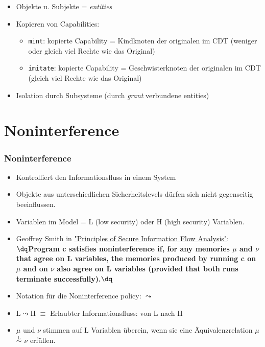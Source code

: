\documentclass{beamer}
\begin{document}
\begin{frame}
\begin{itemize}
\item Objekte u. Subjekte = \textit{entities}
\item Kopieren von Capabilities:
\begin{itemize}
\item \texttt{mint}: kopierte Capability = Kindknoten der originalen im CDT (weniger oder gleich viel Rechte wie das Original)
\item \texttt{imitate}: kopierte Capability = Geschwisterknoten der originalen im CDT (gleich viel Rechte wie das Original)
\end{itemize}
\item Isolation durch Subsysteme (durch \textit{grant} verbundene entities)
\end{itemize}
\end{frame}
\section{Noninterference}
\begin{frame}
\frametitle{Noninterference}
\begin{itemize}
\item Kontrolliert den Informationsfluss in einem System
\item Objekte aus unterschiedlichen Sicherheitslevels dürfen sich nicht gegenseitig beeinflussen.
\item Variablen im Model = L (low security) oder H (high security) Variablen.
\item Geoffrey Smith in \href{http://users.cis.fiu.edu/~smithg/papers/sif06.pdf}{%
"Principles of Secure Information Flow Analysis"}: \\
		\textbf{$\dq$Program c satisfies noninterference if, for any memories $\mu$ and $\nu$ that agree on L variables, the memories produced by running c on $\mu$ and on $\nu$ also agree on L variables (provided that both runs terminate successfully).$\dq$} 
\item Notation für die Noninterference policy: $\leadsto$
\item L$\leadsto$H $\equiv$ Erlaubter Informationsfluss: von L nach H
\item $\mu$ und $\nu$ stimmen auf L Variablen überein, wenn sie eine Äquivalenzrelation $\mu$ $\overset{\text{L}}{\sim}$ $\nu$ erfüllen.
\end{itemize}
\end{frame}
\end{document}
